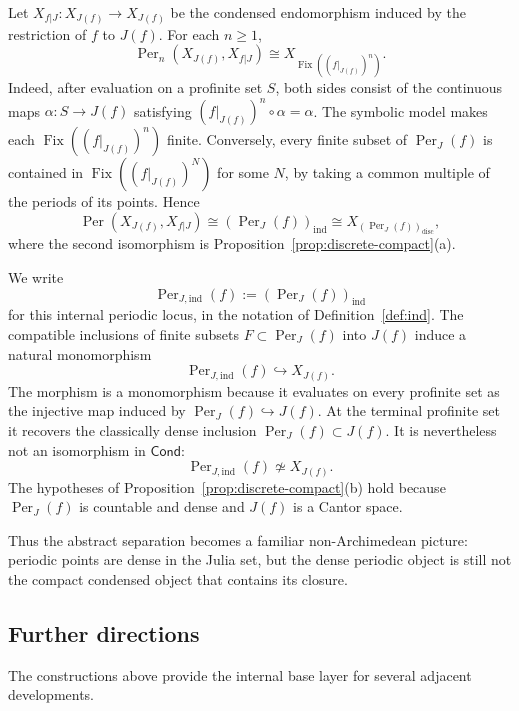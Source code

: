\documentclass[10pt]{amsart}
\newcommand{\Cond}{\mathsf{Cond}}
\newcommand{\Fix}{\operatorname{Fix}}
\newcommand{\Per}{\operatorname{Per}}
\theoremstyle{plain}
\theoremstyle{definition}
\begin{document}
Let \(X_{f|J}:X_{J(f)}\to X_{J(f)}\) be the condensed endomorphism induced by
the restriction of \(f\) to \(J(f)\). For each \(n\ge1\),
\[
  \Per_n(X_{J(f)},X_{f|J})
  \cong
  X_{\Fix((f|_{J(f)})^n)}.
\]
Indeed, after evaluation on a profinite set \(S\), both sides consist of the
continuous maps \(\alpha:S\to J(f)\) satisfying
\((f|_{J(f)})^n\circ\alpha=\alpha\). The symbolic model makes each
\(\Fix((f|_{J(f)})^n)\) finite. Conversely, every finite subset of
\(\Per_J(f)\) is contained in \(\Fix((f|_{J(f)})^N)\) for some \(N\), by taking
a common multiple of the periods of its points. Hence
\[
  \Per(X_{J(f)},X_{f|J})
  \cong
  (\Per_J(f))_{\mathrm{ind}}
  \cong
  X_{(\Per_J(f))_{\mathrm{disc}}},
\]
where the second isomorphism is Proposition~\ref{prop:discrete-compact}(a).

We write
\[
  \Per_{J,\mathrm{ind}}(f):=(\Per_J(f))_{\mathrm{ind}}
\]
for this internal periodic locus, in the notation of Definition~\ref{def:ind}.
The compatible inclusions of finite subsets \(F\subset \Per_J(f)\) into \(J(f)\)
induce a natural monomorphism
\[
  \Per_{J,\mathrm{ind}}(f)\hookrightarrow X_{J(f)}.
\]
The morphism is a monomorphism because it evaluates on every profinite set as
the injective map induced by $\Per_J(f)\hookrightarrow J(f)$. At the terminal
profinite set it recovers the classically dense inclusion
$\Per_J(f)\subset J(f)$. It is nevertheless not an isomorphism in $\Cond$:
\[
  \Per_{J,\mathrm{ind}}(f)
  \not\simeq
  X_{J(f)}.
\]
The hypotheses of Proposition~\ref{prop:discrete-compact}(b) hold because
$\Per_J(f)$ is countable and dense and $J(f)$ is a Cantor space.

Thus the abstract separation becomes a familiar non-Archimedean picture:
periodic points are dense in the Julia set, but the dense periodic object is
still not the compact condensed object that contains its closure.

\subsection{Further directions}
\label{sec:outlook}

The constructions above provide the internal base layer for several adjacent
developments.
\end{document}
